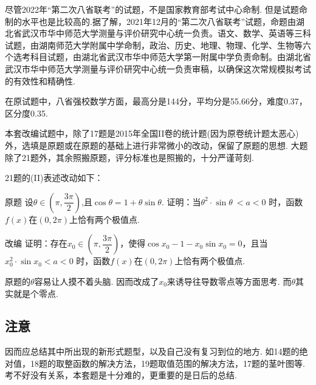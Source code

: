 \documentclass[11pt]{article}
\begin{document}
尽管2022年“第二次八省联考”的试题，不是国家教育部考试中心命制. 但是试题命制的水平也是比较高的.据了解，2021年12月的“第二次八省联考”试题，命题由湖北省武汉市华中师范大学测量与评价研究中心统一负责。语文、数学、英语等三科试题，由湖南师范大学附属中学命制，政治、历史、地理、物理、化学、生物等六个选考科目试题，由湖北省武汉市华中师范大学第一附属中学负责命制。由湖北省武汉市华中师范大学测量与评价研究中心统一负责审稿，以确保这次常规模拟考试的有效性和精确性. 

在原试题中，八省强校数学方面，最高分是144分，平均分是55.66分，难度0.37，区分度0.35.

本套改编试题中，除了17题是2015年全国II卷的统计题(因为原卷统计题太恶心)外，选填是原题或在原题的基础上进行非常微小的改动，保留了原题的思想. 大题除了21题外，其余照搬原题，评分标准也是照搬的，十分严谨苛刻.

21题的(II)表述改动如下：
\begin{compactdesc}
	\item[\heiti 原题] \kaishu 设$ \theta \in \left ( \pi,\dfrac{3\pi}{2}  \right )  $,且$ \cos \theta = 1+ \theta \sin \theta $. 证明：当$ \theta^2 \cdot \sin \theta\ <a<0$	时，函数$ f(x) $在$ (0,2\pi) $上恰有两个极值点.
	\item[\heiti 改编] 证明：存在$ x_0 \in \left ( \pi,\dfrac{3\pi}{2}  \right )  $，使得$ \cos x_0 - 1 - x_0 \sin x_0 =0$，且当$ x_0^2 \cdot \sin x_0 <a<0$	时，函数$ f(x) $在$ (0,2\pi) $上恰有两个极值点.
\end{compactdesc}
原题的$ \theta $容易让人摸不着头脑. 因而改成了$ x_0 $来诱导往导数零点等方面思考. 而$ \theta $其实就是个零点.

\subsection{\heiti 注意} 
因而应总结其中所出现的新形式题型，以及自己没有复习到位的地方. 如14题的绝对值，18题的取整函数的解决方法，19题取值范围的解决方法，17题的茎叶图等. 考不好没有关系，本套题是十分难的，更重要的是日后的总结. 
\end{document}

